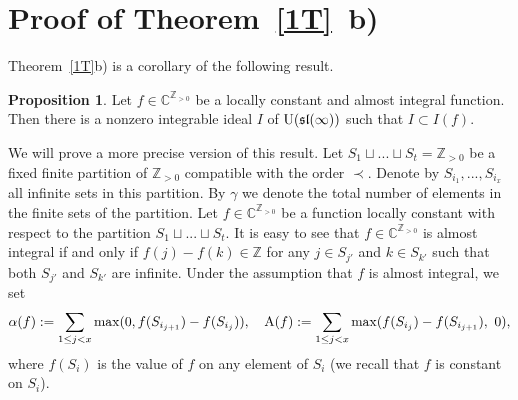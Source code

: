 \documentclass[10pt]{amsart}\oddsidemargin -1mm \evensidemargin -1mm \topmargin -15mm\headheight5mm \headsep 3.5mm \textheight 245mm\textwidth 170mm %
\theoremstyle{definition}\newtheorem{theorem}{Theorem}[section]\newtheorem{lemma}[theorem]{Lemma}\newtheorem{remark}[theorem]{Remark}\newtheorem{proposition}[theorem]{Proposition}\newtheorem{corollary}[theorem]{Corollary}\newtheorem{definition}[theorem]{Definition}\newtheorem{Ex}[theorem]{Example}
\begin{document}
\section{Proof of Theorem~\ref{1T}~b)}\label{Spr1tb}
Theorem~\ref{1T}b) is a corollary of the following result.
\begin{proposition}\label{Pt3+} Let $f\in\mathbb C^{\mathbb Z_{>0}}$ be a locally constant and almost integral function. Then there is a nonzero integrable ideal $I$ of $\operatorname{\mathrm{U}}(\frak{sl}(\infty))$ such that $I\subset I(f)$.\end{proposition}

We will prove a more precise version of this result. Let $S_1\sqcup...\sqcup S_t=\mathbb Z_{>0}$ be a fixed finite partition of $\mathbb Z_{>0}$ compatible with the order $\prec$. Denote by $S_{i_1},..., S_{i_x}$ all infinite sets in this partition. By $\gamma$ we denote the total number of elements in the finite sets of the partition. Let $f\in\mathbb C^{\mathbb Z_{>0}}$ be a function locally constant with respect to the partition $S_1\sqcup...\sqcup S_t$. It is easy to see that $f\in\mathbb C^{\mathbb Z_{>0}}$ is almost integral if and only if $f(j)-f(k)\in\mathbb Z$ for any $j\in S_{j'}$ and $k\in S_{k'}$ such that both $S_{j'}$ and $S_{k'}$ are infinite. Under the assumption that $f$ is almost integral, we set
\begin{equation}\operatorname{\alpha}(f):=\sum\limits_{1\le j< x}\max(0, f(S_{i_{j+1}})-f(S_{i_j})),\hspace{10pt} \operatorname{A}(f):=\sum\limits_{1\le j< x}\max(f(S_{i_{j}})-f(S_{i_{j+1}}),~0),\label{Enint}\end{equation}where $f(S_i)$ is the value of $f$ on any element of $S_i$ (we recall that $f$ is constant on $S_i$).
\end{document}
